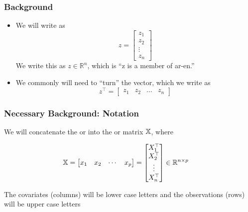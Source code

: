 \documentclass{beamer}
\begin{document}


\begin{frame}
\frametitle{Background}
\begin{itemize}
\item We will write  as 
\[
z = 
\begin{bmatrix}
z_1\\
z_2\\ 
\vdots \\
z_n
\end{bmatrix}
\]
We write this as $z \in \mathbb{R}^n$, which is ``z is a member of ar-en.''
\item We commonly will need to ``turn'' the vector, which we write as
\[
z^{\top}
=
\begin{bmatrix}
z_1 & z_2 & \ldots & z_n
\end{bmatrix}
\]
\end{itemize}
\end{frame}

\begin{frame}
\frametitle{Necessary Background: Notation}

We will concatenate the  or  into the  or  matrix $\mathbb{X}$,
where

\begin{align*}
\mathbb{X} 
& = 
\begin{bmatrix}
x_1 &  x_2 & \cdots & x_p
\end{bmatrix} 
= 
\begin{bmatrix}
X_1^{\top} \\
 X_2 ^{\top}\\
 \vdots \\
  X_n^{\top}
\end{bmatrix}
\in
\mathbb{R}^{n \times p}
\end{align*}
%

\vsp
{} The covariates (columns) will be lower case letters
and the observations (rows) will be upper case letters

\vsp
{}
\end{frame}
\end{document}
